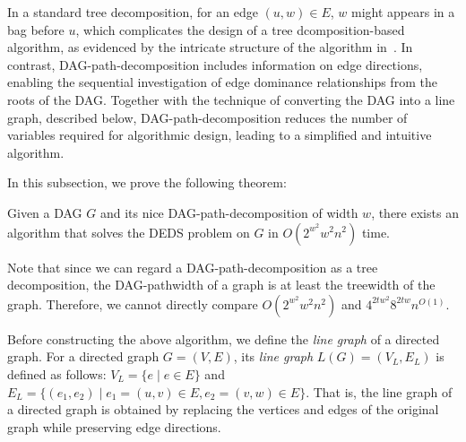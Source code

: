 \documentclass[runningheads]{llncs}
\theoremstyle{plain}
\theoremstyle{definition}
\begin{document}
In a standard tree decomposition, for an edge $(u, w) \in E$, $w$ might appears in a bag before $u$, which complicates the design of a tree dcomposition-based algorithm, as evidenced by the intricate structure of the algorithm in~\cite{art22}.
%
%
In contrast, DAG-path-decomposition includes information on edge directions, enabling the sequential investigation of edge dominance relationships from the roots of the DAG.  
Together with the technique of converting the DAG into a line graph, described below, DAG-path-decomposition reduces the number of variables required for algorithmic design, leading to a simplified and intuitive algorithm. 

In this subsection, we prove the following theorem:  

\begin{theorem}\label{DEDS_FPT}
    Given a DAG \(G\) and its nice DAG-path-decomposition of width \(w\), there exists an algorithm that solves the DEDS problem on \(G\) in \(O(2^{w^2} w^2 n^2)\) time.  
\end{theorem}
%
Note that since we can regard a DAG-path-decomposition as a tree decomposition, the DAG-pathwidth of a graph is at least the treewidth of the graph. Therefore, we cannot directly compare \(O(2^{w^2} w^2 n^2)\) and \(4^{2tw^2} 8^{2tw} n^{O(1)}\).

Before constructing the above algorithm, we define the \emph{line graph} of a directed graph.  
For a directed graph \(G = (V, E)\), its \emph{line graph} \(L(G) = (V_L, E_L)\) is defined as follows:  
\(V_L = \{e \mid e \in E\}\) and \(E_L = \{(e_1, e_2) \mid e_1 = (u, v) \in E, e_2 = (v, w) \in E\}\).  
That is, the line graph of a directed graph is obtained by replacing the vertices and edges of the original graph while preserving edge directions.  
\end{document}
